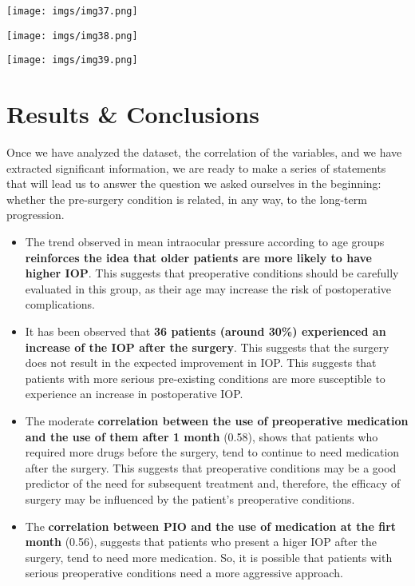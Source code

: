 \documentclass{article}
\begin{document}
\begin{center}
    {\texttt{[image: imgs/img37.png]}\par}
    {\texttt{[image: imgs/img38.png]}\par}
    {\texttt{[image: imgs/img39.png]}\par}
\end{center}


\section{Results \& Conclusions}

Once we have analyzed the dataset, the correlation of the variables, and we have extracted significant information,
we are ready to make a series of statements that will lead us to answer the question we asked ourselves in the beginning: 
whether the pre-surgery condition is related, in any way, to the long-term progression.

\begin{itemize}
    \item The trend observed in mean intraocular pressure according to age groups \textbf{reinforces the idea that older 
    patients are more likely to have higher IOP}. This suggests that preoperative conditions should be carefully 
    evaluated in this group, as their age may increase the risk of postoperative complications.
    \item It has been observed that \textbf{36 patients (around 30\%) experienced an increase of the IOP after the surgery}. This 
    suggests that the surgery does not result in the expected improvement in IOP. This suggests that patients with more serious
    pre-existing conditions are more susceptible to experience an increase in postoperative IOP.
    \item The moderate \textbf{correlation between the use of  preoperative medication and the use of them after 1 month} (0.58), 
    shows that patients who required more drugs before the surgery, tend to continue to need medication after the surgery. 
    This suggests that preoperative conditions may be a good predictor of the need for subsequent treatment and, therefore, the 
    efficacy of surgery may be influenced by the patient's preoperative conditions.
    \item The \textbf{correlation between PIO and the use of medication at the firt month} (0.56), suggests that patients who present
    a higer IOP after the surgery, tend to need more medication. So, it is possible that patients with serious preoperative conditions 
    need a more aggressive approach.

\end{itemize}
\end{document}
